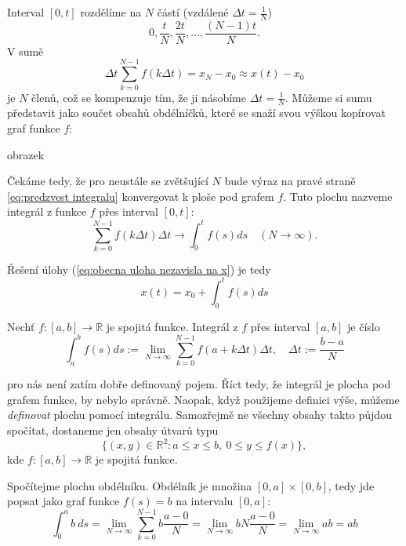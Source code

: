 Interval $[0,t]$ rozdělíme na $N$ částí (vzdálené $\Delta t = \frac{1}{N}$)
\begin{equation*}
  0, \frac{t}{N}, \frac{2t}{N}, \hdots, \frac{(N-1)t}{N}.
\end{equation*}
V sumě
\begin{equation}\label{eq:predzvest integralu}
  \Delta t\sum_{k=0}^{N-1}f(k\Delta t) = x_N-x_0 \approx x(t)-x_0
\end{equation}
je $N$ členů, což se kompenzuje tím, že ji násobíme $\Delta t=\frac{1}{N}.$ Můžeme si sumu představit jako součet obsahů obdélníčků, které se snaží svou výškou kopírovat graf funkce $f$:
\begin{Todo}
  obrazek
\end{Todo}
Čekáme tedy, že pro neustále se zvětšující $N$ bude výraz na pravé straně \ref{eq:predzvest integralu} konvergovat k ploše pod grafem $f$. Tuto plochu nazveme integrál z funkce $f$ přes interval $[0,t]:$
\begin{equation*}
	\sum_{k=0}^{N-1}f(k\Delta t)\Delta t\to \int_0^tf(s)ds \quad (N\to\infty).
\end{equation*}

Řešení úlohy (\ref{eq:obecna uloha nezavisla na x}) je tedy
\begin{equation*}
  x(t)=x_0+\int_0^tf(s)ds
\end{equation*}

\begin{definice}
	Nechť $f\colon [a,b]\to \mathbb{R}$ je spojitá funkce. Integrál z $f$ přes interval $[a,b]$ je číslo
	\begin{equation*}
		\int_a^bf(s)ds := \lim_{N\to \infty} \sum_{k=0}^{N-1}f\left(a+k\Delta t\right)\Delta t,\quad \Delta t:=\frac{b-a}{N}
	\end{equation*}
\end{definice}
\begin{poznámka}
	 pro nás není zatím dobře definovaný pojem. Říct tedy, že integrál je plocha pod grafem funkce, by nebylo správně. Naopak, když použijeme definici výše, můžeme \emph{definovat} plochu pomocí integrálu. Samozřejmě ne všechny obsahy takto půjdou spočítat, dostaneme jen obsahy útvarů typu
	\begin{equation*}
		\{(x,y)\in \mathbb{R}^{2}\colon a\leq x\leq b,\ 0\leq y\leq f(x)\},
	\end{equation*}
	kde $f\colon [a,b]\to \mathbb{R}$ je spojitá funkce.
\end{poznámka}

\begin{příklad}
	Spočítejme plochu obdélníku. Obdélník je množina $[0,a]\times [0,b]$, tedy jde popsat jako graf funkce $f(s)=b$ na intervalu $[0,a]:$
	\begin{equation*}
		\int_0^ab\ ds=\lim_{N\to \infty}\sum_{k=0}^{N-1}b \frac{a-0}{N}=\lim_{N\to \infty}bN \frac{a-0}{N}=\lim_{N\to \infty}ab = ab
	\end{equation*}
\end{příklad}

